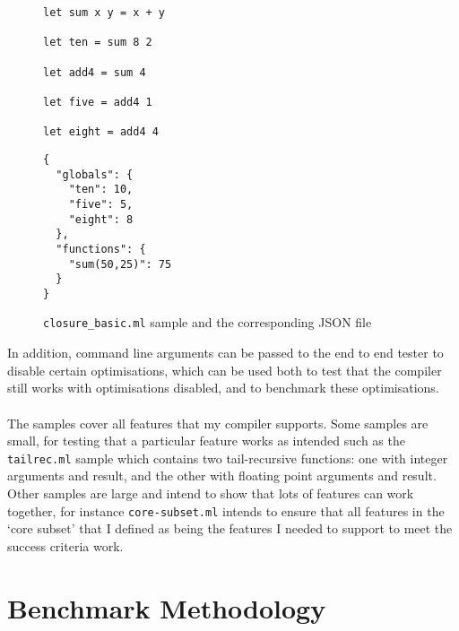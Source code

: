 \documentclass[12pt,twoside,notitlepage]{report}
\newcommand{\textinline}{\texttt}
\newcommand{\cfbox}[2]{%
	\colorlet{currentcolor}{.}%
	{\color{#1}%
		\fbox{\color{currentcolor}#2}}%
}
\newcommand\note[1]{\noindent\cfbox{blue}{\parbox{\textwidth}{\textcolor{blue}{#1}}}}
\begin{document}
\begin{figure}[h]
	\begin{minipage}[t]{0.5\linewidth}
		\begin{verbatim}
let sum x y = x + y

let ten = sum 8 2

let add4 = sum 4

let five = add4 1

let eight = add4 4
		\end{verbatim}
	\end{minipage}
	\begin{minipage}[t]{0.5\linewidth}
		\begin{verbatim}
{
  "globals": {
    "ten": 10,
    "five": 5,
    "eight": 8
  },
  "functions": {
    "sum(50,25)": 75
  }
}
		\end{verbatim}
	\end{minipage}
	\caption{\textinline{closure_basic.ml} sample and the corresponding JSON file}
	\label{fig:sample}
\end{figure}
In addition, command line arguments can be passed to the end to end tester to disable certain optimisations, which can be used both to test that the compiler still works with optimisations disabled, and to benchmark these optimisations.
\\\\
The samples cover all features that my compiler supports. Some samples are small, for testing that a particular feature works as intended such as the \textinline{tailrec.ml} sample which contains two tail-recursive functions: one with integer arguments and result, and the other with floating point arguments and result. Other samples are large and intend to show that lots of features can work together, for instance \textinline{core-subset.ml} intends to ensure that all features in the `core subset' that I defined as being the features I needed to support to meet the success criteria work.

\section{Benchmark Methodology}
\note{
	\begin{itemize}
		\item Gcd: main target of optimisations. Went from 122ms to 8ms thanks to all of them.
		\item others: they improve (e.g. especially with direct call generation), but not as much with the other optimisations
		\item Make some performance graphs of the final result vs other execution engines, and of different optimisations enabled/disabled (can do both time and memory for that).
	\end{itemize}
}
\end{document}
